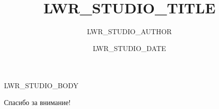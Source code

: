 \documentclass{beamer}
\author{LWR_STUDIO_AUTHOR}
\title{LWR_STUDIO_TITLE}
\date{LWR_STUDIO_DATE}
\begin{document}
\maketitle

LWR_STUDIO_BODY

\begin{frame}
  \begin{center}
  {\LARGE Спасибо за внимание!}
  \end{center}
\end{frame}
\end{document}
